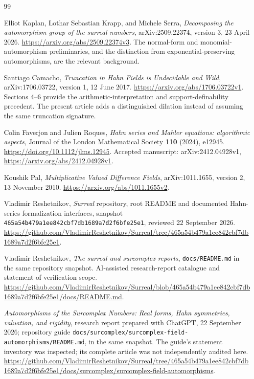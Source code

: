 \documentclass[11pt,oneside]{article}
\numberwithin{equation}{section}
\theoremstyle{definition}
\theoremstyle{remark}
\begin{document}
\begin{thebibliography}{99}
\small
\raggedright

Elliot Kaplan, Lothar Sebastian Krapp, and Michele Serra,
\emph{Decomposing the automorphism group of the surreal numbers},
arXiv:2509.22374, version 3, 23 April 2026.
\url{https://arxiv.org/abs/2509.22374v3}.
The normal-form and monomial-automorphism preliminaries, and the distinction
from exponential-preserving automorphisms, are the relevant background.

Santiago Camacho,
\emph{Truncation in Hahn Fields is Undecidable and Wild},
arXiv:1706.03722, version 1, 12 June 2017.
\url{https://arxiv.org/abs/1706.03722v1}.
Sections 4--6 provide the arithmetic-interpretation and support-definability
precedent. The present article adds a distinguished dilation instead of
assuming the same truncation signature.

Colin Faverjon and Julien Roques,
\emph{Hahn series and Mahler equations: algorithmic aspects},
Journal of the London Mathematical Society \textbf{110} (2024), e12945.
\url{https://doi.org/10.1112/jlms.12945}.
Accepted manuscript: arXiv:2412.04928v1,
\url{https://arxiv.org/abs/2412.04928v1}.

Koushik Pal,
\emph{Multiplicative Valued Difference Fields},
arXiv:1011.1655, version 2, 13 November 2010.
\url{https://arxiv.org/abs/1011.1655v2}.

Vladimir Reshetnikov, \emph{Surreal} repository, root README and documented
Hahn-series formalization interfaces, snapshot
\texttt{465a54b479a1ee842cbf7db1689a7d2f6bfe25e1}, reviewed
22 September 2026.
\url{https://github.com/VladimirReshetnikov/Surreal/tree/465a54b479a1ee842cbf7db1689a7d2f6bfe25e1}.

Vladimir Reshetnikov, \emph{The surreal and surcomplex reports},
\texttt{docs/README.md} in the same repository snapshot.
AI-assisted research-report catalogue and statement of verification scope.
\url{https://github.com/VladimirReshetnikov/Surreal/blob/465a54b479a1ee842cbf7db1689a7d2f6bfe25e1/docs/README.md}.

\emph{Automorphisms of the Surcomplex Numbers: Real forms, Hahn symmetries,
valuation, and rigidity}, research report prepared with ChatGPT,
22 September 2026; repository guide
\texttt{docs/surcomplex/surcomplex-field-automorphisms/README.md},
in the same snapshot. The guide's statement inventory was inspected;
its complete article was not independently audited here.
\url{https://github.com/VladimirReshetnikov/Surreal/tree/465a54b479a1ee842cbf7db1689a7d2f6bfe25e1/docs/surcomplex/surcomplex-field-automorphisms}.

\end{thebibliography}
\end{document}
